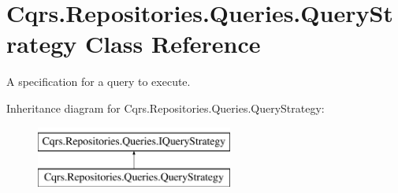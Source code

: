 \hypertarget{classCqrs_1_1Repositories_1_1Queries_1_1QueryStrategy}{}\section{Cqrs.\+Repositories.\+Queries.\+Query\+Strategy Class Reference}
\label{classCqrs_1_1Repositories_1_1Queries_1_1QueryStrategy}


A specification for a query to execute.  


Inheritance diagram for Cqrs.\+Repositories.\+Queries.\+Query\+Strategy\+:\begin{figure}[H]
\begin{center}
\leavevmode
\includegraphics[height=2.000000cm]{classCqrs_1_1Repositories_1_1Queries_1_1QueryStrategy}
\end{center}
\end{figure}
